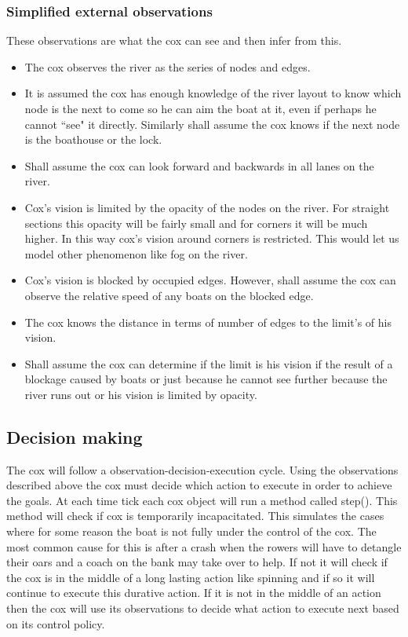       \subsubsection{Simplified external observations}
      These observations are what the cox can see and then infer from this.
      \begin{itemize}
        \item The cox observes the river as the series of nodes and edges.
        \item It is assumed the cox has enough knowledge of the river layout to know which node is the next to come so he can aim the boat at it, even if perhaps he cannot ``see" it directly. Similarly shall assume the cox knows if the next node is the boathouse or the lock.
        \item Shall assume the cox can look forward and backwards in all lanes on the river.
        \item Cox's vision is limited by the opacity of the nodes on the river. For straight sections this opacity will be fairly small and for corners it will be much higher. In this way cox's vision around corners is restricted. This would let us model other phenomenon like fog on the river.
        \item Cox's vision is blocked by occupied edges. However, shall assume the cox can observe the relative speed of any boats on the blocked edge.
        \item The cox knows the distance in terms of number of edges to the limit's of his vision.
        \item Shall assume the cox can determine if the limit is his vision if the result of a blockage caused by boats or just because he cannot see further because the river runs out or his vision is limited by opacity.
      \end{itemize}
      
      \subsection{Decision making}
      The cox will follow a observation-decision-execution cycle. Using the observations described above the cox must decide which action to execute in order to achieve the goals. At each time tick each cox object will run a method called step(). This method will check if cox is temporarily incapacitated. This simulates the cases where for some reason the boat is not fully under the control of the cox. The most common cause for this is after a crash when the rowers will have to detangle their oars and a coach on the bank may take over to help. If not it will check if the cox is in the middle of a long lasting action like spinning and if so it will continue to execute this durative action. If it is not in the middle of an action then the cox will use its observations to decide what action to execute next based on its control policy.
      
